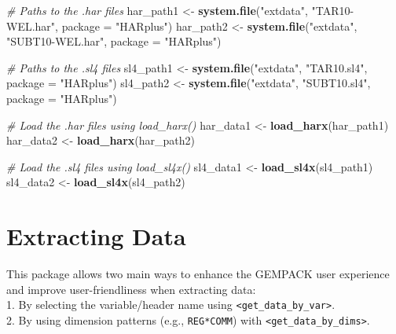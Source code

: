 \documentclass[
]{article}
\newenvironment{Shaded}{\begin{snugshade}}{\end{snugshade}}
\newcommand{\AttributeTok}[1]{\textcolor[rgb]{0.13,0.29,0.53}{#1}}
\newcommand{\CommentTok}[1]{\textcolor[rgb]{0.56,0.35,0.01}{\textit{#1}}}
\newcommand{\FunctionTok}[1]{\textcolor[rgb]{0.13,0.29,0.53}{\textbf{#1}}}
\newcommand{\NormalTok}[1]{#1}
\newcommand{\OtherTok}[1]{\textcolor[rgb]{0.56,0.35,0.01}{#1}}
\newcommand{\StringTok}[1]{\textcolor[rgb]{0.31,0.60,0.02}{#1}}
\begin{document}
\begin{Shaded}
\begin{Highlighting}[]
\CommentTok{\# Paths to the .har files}
\NormalTok{har\_path1 }\OtherTok{\textless{}{-}} \FunctionTok{system.file}\NormalTok{(}\StringTok{"extdata"}\NormalTok{, }\StringTok{"TAR10{-}WEL.har"}\NormalTok{, }\AttributeTok{package =} \StringTok{"HARplus"}\NormalTok{)}
\NormalTok{har\_path2 }\OtherTok{\textless{}{-}} \FunctionTok{system.file}\NormalTok{(}\StringTok{"extdata"}\NormalTok{, }\StringTok{"SUBT10{-}WEL.har"}\NormalTok{, }\AttributeTok{package =} \StringTok{"HARplus"}\NormalTok{)}

\CommentTok{\# Paths to the .sl4 files}
\NormalTok{sl4\_path1 }\OtherTok{\textless{}{-}} \FunctionTok{system.file}\NormalTok{(}\StringTok{"extdata"}\NormalTok{, }\StringTok{"TAR10.sl4"}\NormalTok{, }\AttributeTok{package =} \StringTok{"HARplus"}\NormalTok{)}
\NormalTok{sl4\_path2 }\OtherTok{\textless{}{-}} \FunctionTok{system.file}\NormalTok{(}\StringTok{"extdata"}\NormalTok{, }\StringTok{"SUBT10.sl4"}\NormalTok{, }\AttributeTok{package =} \StringTok{"HARplus"}\NormalTok{)}

\CommentTok{\# Load the .har files using load\_harx()}
\NormalTok{har\_data1 }\OtherTok{\textless{}{-}} \FunctionTok{load\_harx}\NormalTok{(har\_path1)}
\NormalTok{har\_data2 }\OtherTok{\textless{}{-}} \FunctionTok{load\_harx}\NormalTok{(har\_path2)}

\CommentTok{\# Load the .sl4 files using load\_sl4x()}
\NormalTok{sl4\_data1 }\OtherTok{\textless{}{-}} \FunctionTok{load\_sl4x}\NormalTok{(sl4\_path1)}
\NormalTok{sl4\_data2 }\OtherTok{\textless{}{-}} \FunctionTok{load\_sl4x}\NormalTok{(sl4\_path2)}
\end{Highlighting}
\end{Shaded}

\section{Extracting Data}\label{extracting-data}

This package allows two main ways to enhance the GEMPACK user experience
and improve user-friendliness when extracting data:\\
1. By selecting the variable/header name using
\texttt{\textless{}get\_data\_by\_var\textgreater{}}.\\
2. By using dimension patterns (e.g., \texttt{REG*COMM}) with
\texttt{\textless{}get\_data\_by\_dims\textgreater{}}.
\end{document}
